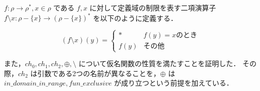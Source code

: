 \begin{dfn}
  $f : \rho \rightarrow \rho^*, x \in \rho$ である $f, x$ に対して定義域の制限を表す二項演算子 $f \setminus x : \rho - \{x\} \rightarrow (\rho - \{x\})^*$ を以下のように定義する． \\
\begin{adjustvboxheight}
  \[ (f \setminus x)(y) = \begin{cases}
    \ast & f(y) = x \mbox{のとき} \\
    f(y) & \mbox{その他}
  \end{cases} \]
  \vspace{1pt}
\end{adjustvboxheight}
\end{dfn}


また，$ch_0, ch_1, ch_2, \oplus, \setminus$ について仮名関数の性質を満たすことを証明した．
その際，$ch_2$ は引数である2つの名前が異なることを，$\oplus$ は $in\_domain\_in\_range, fun\_exclusive$ が成り立つという前提を加えている．










